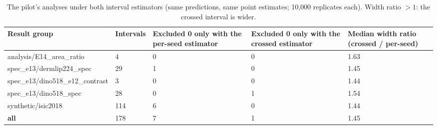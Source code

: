 \begin{table}[H]\centering\scriptsize
\caption{The pilot's analyses under both interval estimators (same predictions, same point estimates; 10,000 replicates each). Width ratio $>1$: the crossed interval is wider.}\label{tab:estcheck}
\begin{tabular}{p{5.0cm}p{1.4cm}p{2.6cm}p{2.6cm}p{2.4cm}}\toprule
Result group & Intervals & Excluded 0 only with the per-seed estimator & Excluded 0 only with the crossed estimator & Median width ratio (crossed / per-seed) \\\midrule
analysis/\allowbreak{}E14\_area\_ratio & 4 & 0 & 0 & 1.63 \\
spec\_e13/\allowbreak{}dermlip224\_spec & 29 & 1 & 0 & 1.45 \\
spec\_e13/\allowbreak{}dino518\_e12\_contrast & 3 & 0 & 0 & 1.44 \\
spec\_e13/\allowbreak{}dino518\_spec & 28 & 0 & 1 & 1.54 \\
synthetic/\allowbreak{}isic2018 & 114 & 6 & 0 & 1.44 \\
\textbf{all} & 178 & 7 & 1 & 1.45 \\
\bottomrule\end{tabular}
\end{table}
